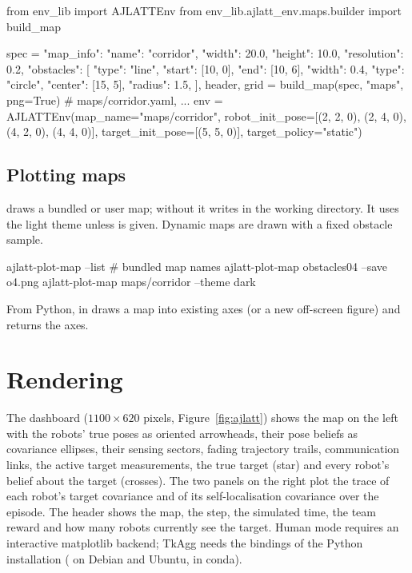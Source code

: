 \begin{pycode}
from env_lib import AJLATTEnv
from env_lib.ajlatt_env.maps.builder import build_map

spec = {
    "map_info": {"name": "corridor", "width": 20.0, "height": 10.0,
                 "resolution": 0.2},
    "obstacles": [
        {"type": "line", "start": [10, 0], "end": [10, 6], "width": 0.4},
        {"type": "circle", "center": [15, 5], "radius": 1.5},
    ],
}
header, grid = build_map(spec, "maps", png=True)   # maps/corridor.yaml, ...
env = AJLATTEnv(map_name="maps/corridor",
                robot_init_pose=[(2, 2, 0), (2, 4, 0), (4, 2, 0), (4, 4, 0)],
                target_init_pose=[(5, 5, 0)], target_policy="static")
\end{pycode}

\subsection{Plotting maps}\label{sec:ajlatt-plot}

 draws a bundled or user map; without  it
writes  in the working directory. It uses the light theme unless
 is given. Dynamic maps are drawn with a fixed obstacle
sample.

\begin{shellcode}
ajlatt-plot-map --list                          # bundled map names
ajlatt-plot-map obstacles04 --save o4.png
ajlatt-plot-map maps/corridor --theme dark
\end{shellcode}

From Python,  in 
draws a map into existing axes (or a new off-screen figure) and returns the
axes.

\section{Rendering}\label{sec:ajlatt-render}

The dashboard ($1100 \times 620$ pixels, Figure~\ref{fig:ajlatt}) shows the map
on the left with the robots' true poses as oriented arrowheads, their pose
beliefs as covariance ellipses, their sensing sectors, fading trajectory trails,
communication links, the active target measurements, the true target (star)
and every robot's belief about the target (crosses). The two panels on the
right plot the trace of each robot's target covariance and of its
self-localisation covariance over the episode. The header shows the map, the
step, the simulated time, the team reward and how many robots currently see
the target. Human mode requires an interactive matplotlib backend; TkAgg needs
the  bindings of the Python installation ( on Debian
and Ubuntu,  in conda).

